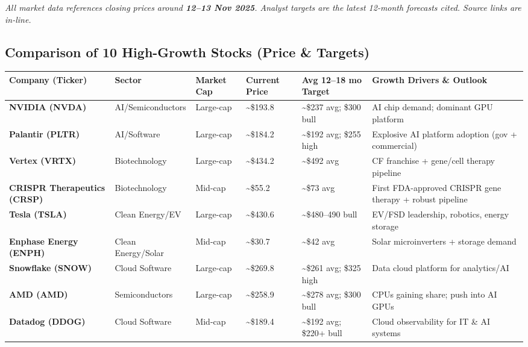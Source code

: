 \documentclass[
]{article}
\begin{document}
\emph{All market data references closing prices around \textbf{12--13
Nov 2025}. Analyst targets are the latest 12-month forecasts cited.
Source links are in-line.}

\hypertarget{comparison-of-10-high-growth-stocks-price-targets}{%
\subsection{Comparison of 10 High-Growth Stocks (Price \&
Targets)}\label{comparison-of-10-high-growth-stocks-price-targets}}

\begin{longtable}[]{@{}
  >{\raggedright\arraybackslash}p{}
  >{\raggedright\arraybackslash}p{}
  >{\raggedright\arraybackslash}p{}
  >{\raggedright\arraybackslash}p{}
  >{\raggedright\arraybackslash}p{}
  >{\raggedright\arraybackslash}p{}@{}}
\toprule
Company (Ticker) & Sector & Market Cap & Current Price & Avg 12--18 mo
Target & Growth Drivers \& Outlook \\
\midrule
\endhead
\textbf{NVIDIA (NVDA)} & AI/Semiconductors & Large-cap &
\textasciitilde\$193.8 & \textasciitilde\$237 avg; \$300 bull & AI chip
demand; dominant GPU platform \\
\textbf{Palantir (PLTR)} & AI/Software & Large-cap &
\textasciitilde\$184.2 & \textasciitilde\$192 avg; \$255 high &
Explosive AI platform adoption (gov + commercial) \\
\textbf{Vertex (VRTX)} & Biotechnology & Large-cap &
\textasciitilde\$434.2 & \textasciitilde\$492 avg & CF franchise +
gene/cell therapy pipeline \\
\textbf{CRISPR Therapeutics (CRSP)} & Biotechnology & Mid-cap &
\textasciitilde\$55.2 & \textasciitilde\$73 avg & First FDA-approved
CRISPR gene therapy + robust pipeline \\
\textbf{Tesla (TSLA)} & Clean Energy/EV & Large-cap &
\textasciitilde\$430.6 & \textasciitilde\$480--490 bull & EV/FSD
leadership, robotics, energy storage \\
\textbf{Enphase Energy (ENPH)} & Clean Energy/Solar & Mid-cap &
\textasciitilde\$30.7 & \textasciitilde\$42 avg & Solar microinverters +
storage demand \\
\textbf{Snowflake (SNOW)} & Cloud Software & Large-cap &
\textasciitilde\$269.8 & \textasciitilde\$261 avg; \$325 high & Data
cloud platform for analytics/AI \\
\textbf{AMD (AMD)} & Semiconductors & Large-cap & \textasciitilde\$258.9
& \textasciitilde\$278 avg; \$300 bull & CPUs gaining share; push into
AI GPUs \\
\textbf{Datadog (DDOG)} & Cloud Software & Mid-cap &
\textasciitilde\$189.4 & \textasciitilde\$192 avg; \$220+ bull & Cloud
observability for IT \& AI systems \\
\bottomrule
\end{longtable}
\end{document}
